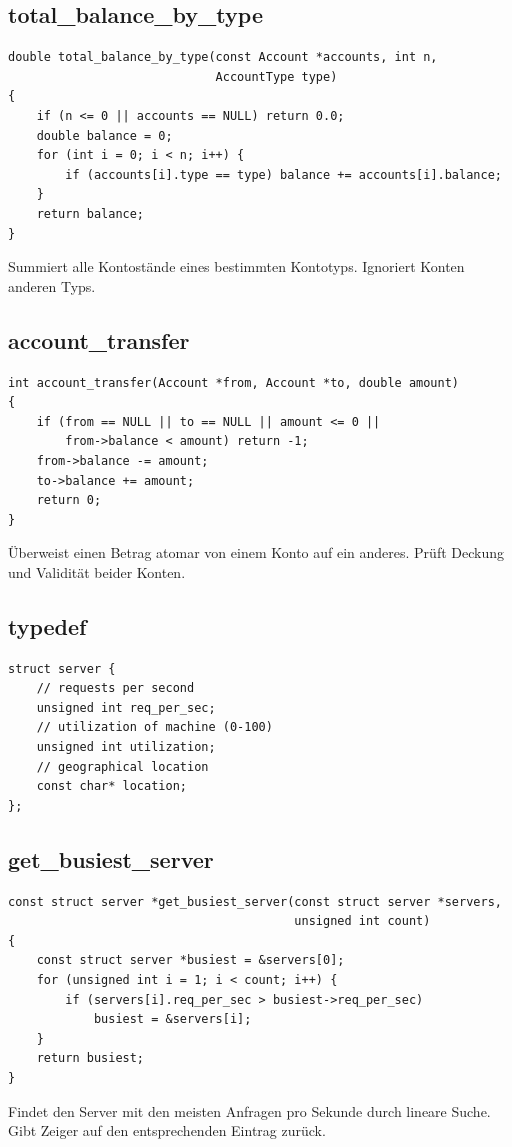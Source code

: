\documentclass[10pt, a4paper]{article}
\begin{document}
\subsection{total\_balance\_by\_type}
\begin{lstlisting}
double total_balance_by_type(const Account *accounts, int n,
                             AccountType type)
{
    if (n <= 0 || accounts == NULL) return 0.0;
    double balance = 0;
    for (int i = 0; i < n; i++) {
        if (accounts[i].type == type) balance += accounts[i].balance;
    }
    return balance;
}
\end{lstlisting}
Summiert alle Kontost\"ande eines bestimmten Kontotyps. Ignoriert Konten anderen Typs.

\subsection{account\_transfer}
\begin{lstlisting}
int account_transfer(Account *from, Account *to, double amount)
{
    if (from == NULL || to == NULL || amount <= 0 ||
        from->balance < amount) return -1;
    from->balance -= amount;
    to->balance += amount;
    return 0;
}
\end{lstlisting}
\"Uberweist einen Betrag atomar von einem Konto auf ein anderes. Pr\"uft Deckung und Validit\"at beider Konten.

\subsection{typedef}
\begin{lstlisting}
struct server {
    // requests per second
    unsigned int req_per_sec;
    // utilization of machine (0-100)
    unsigned int utilization;
    // geographical location
    const char* location;
};
\end{lstlisting}

\subsection{get\_busiest\_server}
\begin{lstlisting}
const struct server *get_busiest_server(const struct server *servers,
                                        unsigned int count)
{
    const struct server *busiest = &servers[0];
    for (unsigned int i = 1; i < count; i++) {
        if (servers[i].req_per_sec > busiest->req_per_sec)
            busiest = &servers[i];
    }
    return busiest;
}
\end{lstlisting}
Findet den Server mit den meisten Anfragen pro Sekunde durch lineare Suche. Gibt Zeiger auf den entsprechenden Eintrag zur\"uck.
\end{document}
